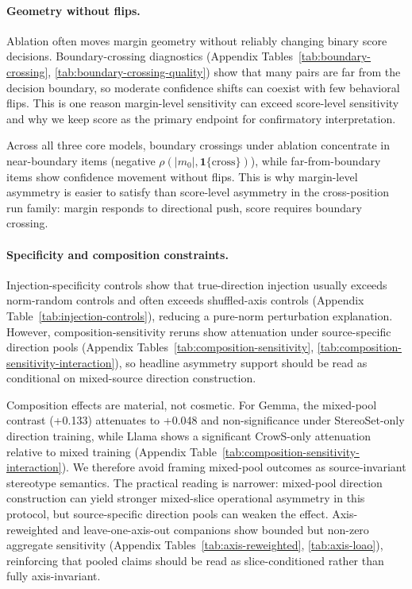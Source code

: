 \paragraph{Geometry without flips.}
Ablation often moves margin geometry without reliably changing binary score decisions. Boundary-crossing diagnostics (Appendix Tables~\ref{tab:boundary-crossing}, \ref{tab:boundary-crossing-quality}) show that many pairs are far from the decision boundary, so moderate confidence shifts can coexist with few behavioral flips. This is one reason margin-level sensitivity can exceed score-level sensitivity and why we keep score as the primary endpoint for confirmatory interpretation.

Across all three core models, boundary crossings under ablation concentrate in near-boundary items (negative $\rho(|m_0|,\mathbf{1}\{\text{cross}\})$), while far-from-boundary items show confidence movement without flips. This is why margin-level asymmetry is easier to satisfy than score-level asymmetry in the cross-position run family: margin responds to directional push, score requires boundary crossing.

\paragraph{Specificity and composition constraints.}
Injection-specificity controls show that true-direction injection usually exceeds norm-random controls and often exceeds shuffled-axis controls (Appendix Table~\ref{tab:injection-controls}), reducing a pure-norm perturbation explanation. However, composition-sensitivity reruns show attenuation under source-specific direction pools (Appendix Tables~\ref{tab:composition-sensitivity}, \ref{tab:composition-sensitivity-interaction}), so headline asymmetry support should be read as conditional on mixed-source direction construction.

Composition effects are material, not cosmetic. For Gemma, the mixed-pool contrast (+0.133) attenuates to +0.048 and non-significance under StereoSet-only direction training, while Llama shows a significant CrowS-only attenuation relative to mixed training (Appendix Table~\ref{tab:composition-sensitivity-interaction}). We therefore avoid framing mixed-pool outcomes as source-invariant stereotype semantics. The practical reading is narrower: mixed-pool direction construction can yield stronger mixed-slice operational asymmetry in this protocol, but source-specific direction pools can weaken the effect.
Axis-reweighted and leave-one-axis-out companions show bounded but non-zero aggregate sensitivity (Appendix Tables~\ref{tab:axis-reweighted}, \ref{tab:axis-loao}), reinforcing that pooled claims should be read as slice-conditioned rather than fully axis-invariant.

